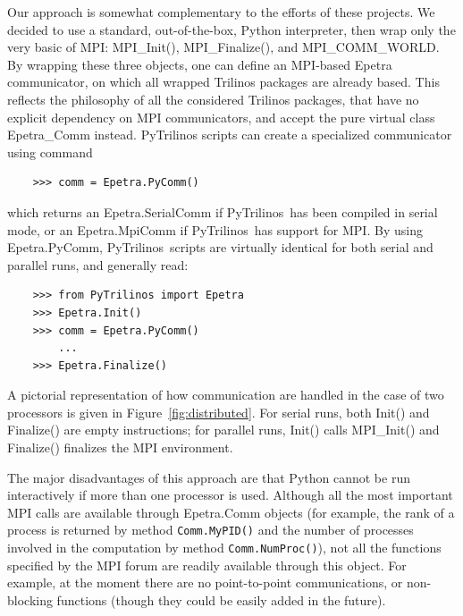 \documentclass[acmtocl]{acmtrans2m}
\newcommand{\PyTrilinos}{{PyTrilinos}}
\begin{document}
Our approach is somewhat complementary to the efforts of these
projects.  We decided to use a standard, out-of-the-box, Python
interpreter, then wrap only the very basic of MPI: MPI\_Init(),
MPI\_Finalize(), and MPI\_COMM\_WORLD. By wrapping these three
objects, one can define an MPI-based Epetra communicator, on which all
wrapped Trilinos packages are already based. This reflects the
philosophy of all the considered Trilinos packages, that have no
explicit dependency on MPI communicators, and accept the pure virtual
class Epetra\_Comm instead. PyTrilinos scripts can create a
specialized communicator using command
\begin{verbatim}
    >>> comm = Epetra.PyComm()
\end{verbatim}
which returns an Epetra.SerialComm if \PyTrilinos\ has been compiled
in serial mode, or an Epetra.MpiComm if \PyTrilinos\ has support for
MPI. By using Epetra.PyComm, \PyTrilinos\ scripts are virtually
identical for both serial and parallel runs, and generally read:
\begin{verbatim}
    >>> from PyTrilinos import Epetra
    >>> Epetra.Init()
    >>> comm = Epetra.PyComm()
        ...
    >>> Epetra.Finalize()
\end{verbatim}
A pictorial representation of how communication are handled in the
case of two processors is given in Figure~\ref{fig:distributed}. For
serial runs, both Init() and Finalize() are empty instructions; for
parallel runs, Init() calls MPI\_Init() and Finalize() finalizes the
MPI environment.

\smallskip

The major disadvantages of this approach are that Python cannot be run
interactively if more than one processor is used.
Although all the most important MPI calls are
available through Epetra.Comm objects (for example, the rank of a
process is returned by method {\tt Comm.MyPID()} and the number of
processes involved in the computation by method {\tt Comm.NumProc()}),
not all the functions specified by the MPI forum are readily available
through this object.  For example, at the moment there are no point-to-point
communications, or non-blocking functions (though they could be easily added in
the future).
\end{document}
